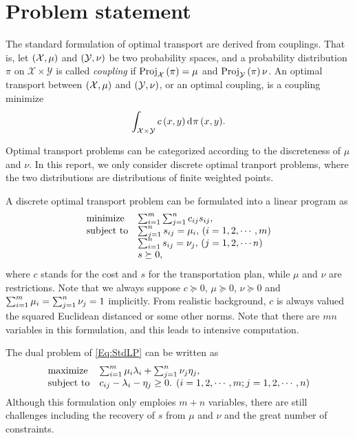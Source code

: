\documentclass[english]{pkupaper}
\begin{document}
\section{Problem statement}

The standard formulation of optimal transport are derived from couplings. \parencite{Villani2009} That is, let $ \left(  \mathcal{X}, \mu  \right) $ and $ \left(  \mathcal{Y}, \nu  \right) $ be two probability spaces, and a probability distribution $\pi$ on $ \mathcal{X} \times \mathcal{Y} $ is called \emph{coupling} if $ \operatorname{\mathrm{Proj}}_{\mathcal{X}} \left( \pi \right) = \mu $ and $ \operatorname{\mathrm{Proj}}_{\mathcal{Y}} \left( \pi \right) \nu $. An optimal transport between $ \left(  \mathcal{X}, \mu  \right) $ and $ \left(  \mathcal{Y}, \nu  \right) $, or an optimal coupling, is a coupling minimize
\begin{equation}
\int_{ \mathcal{X} \times \mathcal{Y} }{ c \left(  x, y  \right) \mathop{\mathrm{d}^{} \!} \pi \left(  x, y  \right) }.
\end{equation}

Optimal transport problems can be categorized according to the discreteness of $\mu$ and $\nu$. In this report, we only consider discrete optimal tranport problems, where the two distributions are distributions of finite weighted points.

A discrete optimal transport problem can be formulated into a linear program as
\begin{equation} \label{Eq:StdLP}
\begin{array}{ll}
\mathrel{\text{{minimize}}} & \sum_{ {i} = {1} }^{m}{\sum_{ {j} = {1} }^{n}{ c_{ i j } s_{ i j } }}, \\
\mathrel{\text{{subject to}}} & \sum_{ {j} = {1} }^{n}{s_{ i j }} = \mu_i, \mathbin{}\left(  i = 1, 2, \cdots, m  \right) \\
& \sum_{ {i} = {1} }^{n}{s_{ i j }} = \nu_j, \mathbin{}\left(  j = 1, 2, \cdots n  \right) \\
& s \succeq 0,
\end{array}
\end{equation}
where $c$ stands for the cost and $s$ for the transportation plan, while $\mu$ and $\nu$ are restrictions. Note that we always suppose $ c \succeq 0 $, $ \mu \succeq 0 $, $ \nu \succeq 0 $ and $ \sum_{ {i} = {1} }^{m}{\mu_i} = \sum_{ {j} = {1} }^{n}{\nu_j} = 1 $ implicitly. From realistic background, $c$ is always valued the squared Euclidean distanced or some other norms. Note that there are $ m n $ variables in this formulation, and this leads to intensive computation.

The dual problem of \eqref{Eq:StdLP} can be written as 
\begin{equation} \label{Eq:Dual}
\begin{array}{ll}
\mathrel{\text{{maximize}}} & \sum_{ {i} = {1} }^{m}{ \mu_i \lambda_i } + \sum_{ {j} = {1} }^{n}{ \nu_j \eta_j }, \\
\mathrel{\text{{subject to}}} & c_{ i j } - \lambda_i - \eta_j \ge 0. \mathbin{}\left(  i = 1, 2, \cdots, m; j = 1, 2, \cdots, n  \right)
\end{array}
\end{equation}
Although this formulation only emploies $ m + n $ variables, there are still challenges including the recovery of $s$ from $\mu$ and $\nu$ and the great number of constraints.
\end{document}
